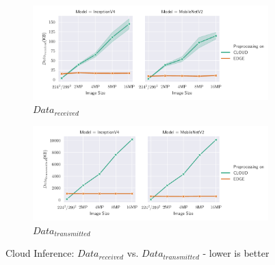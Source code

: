 \begin{figure}[!htb]
\centering
\begin{subfigure}[b]{0.95\textwidth}
   \includegraphics[width=1\linewidth]{./Bilder/single_plots/cloud_inference_plots/Cloud_Inference_Received_Data.pdf}
   \caption{$Data_{received}$}
   \label{fig:CloudInferenceReceivedData} 
\end{subfigure}

\begin{subfigure}[b]{0.95\textwidth}
   \includegraphics[width=1\linewidth]{./Bilder/single_plots/cloud_inference_plots/Cloud_Inference_Transmitted_Data.pdf}
   \caption{$Data_{transmitted}$}
   \label{fig:CloudInferenceTransmittedData}
\end{subfigure}

\caption{Cloud Inference:  $Data_{received}$ vs. $Data_{transmitted}$ - lower is better}
\end{figure}

\FloatBarrier
